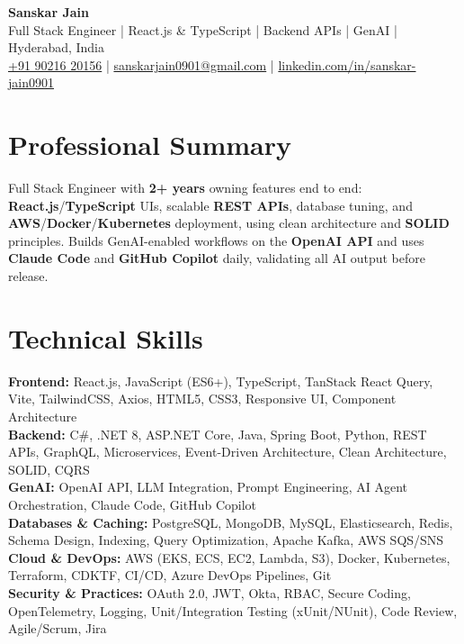 \documentclass[a4paper,10pt]{article}
\begin{document}
\begin{center}
    {\LARGE \textbf{Sanskar Jain}} \\
    \vspace{2pt}
    Full Stack Engineer \;|\; React.js \& TypeScript \;|\; Backend APIs \;|\; GenAI \;|\; Hyderabad, India \\
    \vspace{2pt}
    \href{tel:+919021620156}{+91 90216 20156} \;|\;
    \href{mailto:sanskarjain0901@gmail.com}{sanskarjain0901@gmail.com} \;|\;
    \href{https://www.linkedin.com/in/sanskar-jain0901/}{linkedin.com/in/sanskar-jain0901}
\end{center}

\section*{Professional Summary}
Full Stack Engineer with \textbf{2+ years} owning features end to end: \textbf{React.js}/\textbf{TypeScript} UIs, scalable \textbf{REST APIs}, database tuning, and \textbf{AWS}/\textbf{Docker}/\textbf{Kubernetes} deployment, using clean architecture and \textbf{SOLID} principles.
Builds GenAI-enabled workflows on the \textbf{OpenAI API} and uses \textbf{Claude Code} and \textbf{GitHub Copilot} daily, validating all AI output before release.

\section*{Technical Skills}
\begin{sloppypar}
\noindent
\textbf{Frontend:} React.js, JavaScript (ES6+), TypeScript, TanStack React Query, Vite, TailwindCSS, Axios, HTML5, CSS3, Responsive UI, Component Architecture \\
\textbf{Backend:} C\#, .NET 8, ASP.NET Core, Java, Spring Boot, Python, REST APIs, GraphQL, Microservices, Event-Driven Architecture, Clean Architecture, SOLID, CQRS \\
\textbf{GenAI:} OpenAI API, LLM Integration, Prompt Engineering, AI Agent Orchestration, Claude Code, GitHub Copilot \\
\textbf{Databases \& Caching:} PostgreSQL, MongoDB, MySQL, Elasticsearch, Redis, Schema Design, Indexing, Query Optimization, Apache Kafka, AWS SQS/SNS \\
\textbf{Cloud \& DevOps:} AWS (EKS, ECS, EC2, Lambda, S3), Docker, Kubernetes, Terraform, CDKTF, CI/CD, Azure DevOps Pipelines, Git \\
\textbf{Security \& Practices:} OAuth 2.0, JWT, Okta, RBAC, Secure Coding, OpenTelemetry, Logging, Unit/Integration Testing (xUnit/NUnit), Code Review, Agile/Scrum, Jira
\end{sloppypar}
\end{document}
